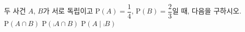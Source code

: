 두 사건 $A$, $B$가 서로 독립이고 $\mathrm{P}(A)=\dfrac{1}{4}$, $\mathrm{P}(B)=\dfrac{2}{3}$일 때, 다음을 구하시오.
 $\mathrm{P}(A\cap B)$
 $\mathrm{P}(\comp{A}\cap B)$
 $\mathrm{P}(A\mid \comp{B})$
